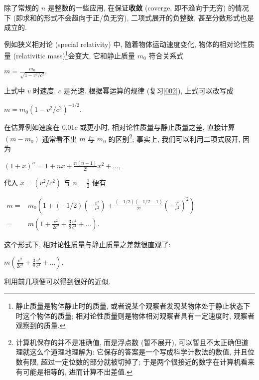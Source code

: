 \begin{tcolorbox}[size=fbox, breakable, enhanced jigsaw, title={应用}]

除了常规的 $n$ 是整数的一些应用, 在保证\textbf{收敛}
(coverge, 即不趋向于无穷) 的情况下 (即求和的形式不会趋向于正/负无穷),
二项式展开的负整数, 甚至分数形式也是成立的.

例如狭义相对论 (special relativity) 中, 随着物体运动速度变化,
物体的相对论性质量 (relativitic mass)\footnote{静止质量是物体静止时的质量,
  或者说某个观察者发现某物体处于静止状态下时这个物体的质量;
  相对论性质量则是物体相对观察者具有一定速度时, 观察者观察到的质量.}会变大,
它和静止质量 $m_0$ 符合关系式

$m=\frac{m_0}{\sqrt{1-v^2/c^2}}.$

上式中 $v$ 时速度, $c$ 是光速. 根据幂运算的规律 (复习\ref{002}),
上式可以改写成

$m=m_0(1-v^2/c^2)^{-1/2}.$

在估算例如速度在 $0.01c$ 或更小时, 相对论性质量与静止质量之差,
直接计算 $(m-m_0)$ 通常看不出 $m$ 与 $m_0$ 的区别\footnote{计算机保存的并不是准确值,
  而是浮点数 (暂不展开), 可以暂且不太正确但道理就这么个道理地理解为:
  它保存的答案是一个写成科学计数法的数值, 并且位数有限,
  超过一定位数的部分就被切掉了;
  于是两个很接近的数字在计算机看来有可能是相等的, 进而计算不出差值.};
事实上, 我们可以利用二项式展开, 因为

$(1+x)^n=1+nx+\frac{n(n-1)}{2!}x^2+...,$

代入 $x=(v^2/c^2)$ 与 $n=\frac{1}{2}$ 便有

$\begin{aligned}m=&m_0\left(1+(-1/2)\left(-\frac{v^2}{c^2}\right)+\frac{(-1/2)(-1/2-1)}{2!}\left(-\frac{v^2}{c^2}\right)^2\right)\\=&m\left(1+\frac{v^2}{2c^2}+\frac{3}{8}\frac{v^4}{c^4}+...\right).\end{aligned}$

这个形式下, 相对论性质量与静止质量之差就很直观了:

$m\left(\frac{v^2}{2c^2}+\frac{3}{8}\frac{v^4}{c^4}+...\right),$

利用前几项便可以得到很好的近似.

\end{tcolorbox}